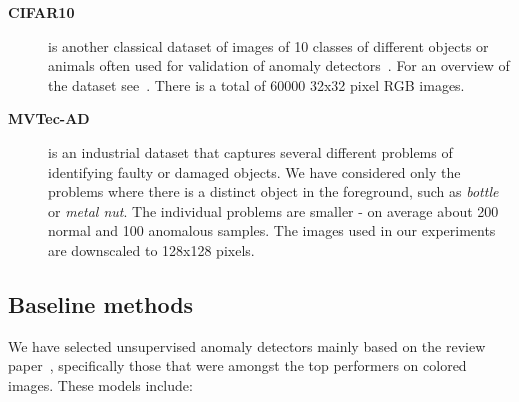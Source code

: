 \begin{description}
    \item[\textbf{CIFAR10}] is another classical dataset of images of 10 classes of different objects or animals often used for validation of anomaly detectors~\cite{ruff2018deep, ruff2019deep, chalapathy2018anomaly}. For an overview of the dataset see~\cite{krizhevsky2009learning}. There is a total of 60000 32x32 pixel RGB images.

    \item[\textbf{MVTec-AD}] is an industrial dataset\cite{bergmann2019mvtec} that captures several different problems of identifying faulty or damaged objects. We have considered only the problems where there is a distinct object in the foreground, such as \textit{bottle} or \textit{metal nut}. The individual problems are smaller - on average about 200 normal and 100 anomalous samples. The images used in our experiments are downscaled to 128x128 pixels.
    
\end{description}

\subsection{Baseline methods}
We have selected unsupervised anomaly detectors mainly based on the review paper~\cite{vskvara2021comparison}, specifically those that were amongst the top performers on colored images. These models include:

